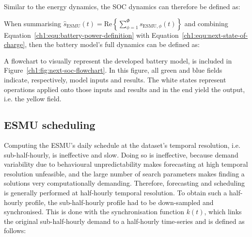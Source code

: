 

Similar to the energy dynamics, the SOC dynamics can therefore be defined as:



When summarising $\hat{s}_\text{ESMU}(t) = \text{Re}\left\{\sum_{\phi=1}^{\Phi}s_{\text{ESMU},\phi}(t)\right\}$ and combining Equation~\ref{ch1:equ:battery-power-definition} with Equation~\ref{ch1:equ:next-state-of-charge}, then the battery model's full dynamics can be defined as:



A flowchart to visually represent the developed battery model, is included in Figure~\ref{ch1:fig:next-soc-flowchart}.
In this figure, all green and blue fields indicate, respectively, model inputs and results.
The white states represent operations applied onto those inputs and results and in the end yield the output, i.e. the yellow field.



\subsection{ESMU scheduling}
\label{ch1:subsec:esmu-scheduling}

Computing the ESMU's daily schedule at the dataset's temporal resolution, i.e. sub-half-hourly, is ineffective and slow.
Doing so is ineffective, because demand variability due to behavioural unpredictability makes forecasting at high temporal resolution unfeasible, and the large number of search parameters makes finding a solutions very computationally demanding.
Therefore, forecasting and scheduling is generally performed at half-hourly temporal resolution.
To obtain such a half-hourly profile, the sub-half-hourly profile had to be down-sampled and synchronised.
This is done with the synchronisation function $k(t)$, which links the original sub-half-hourly demand to a half-hourly time-series and is defined as follows:




